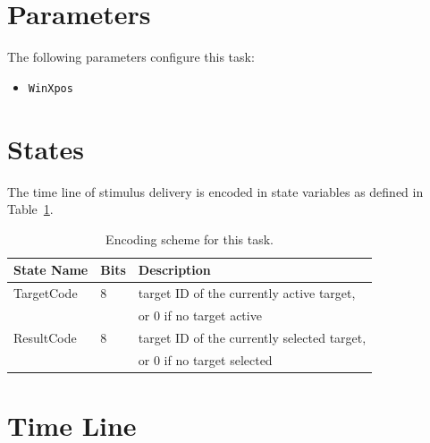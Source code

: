 \documentclass[letterpaper,oneside,12pt]{article}
\begin{document}
\newpage
\section{Parameters}
The following parameters configure this task:
\begin{itemize}
  \item {\tt WinXpos}
\end{itemize}


\section{States}

The time line of stimulus delivery is encoded in state variables as defined in
Table~\ref{tab:states}.
\begin{table}
\begin{center}
\begin{tabular}[ht]{|l|l|l|}
\hline
\bf{State Name}& \bf{Bits}            & \bf{Description} \\
\hline
\hline
 TargetCode & 8 & target ID of the currently active target, \\
            &   & or 0 if no target active \\
 ResultCode & 8 & target ID of the currently selected target, \\
            &   & or 0 if no target selected \\
\hline
\end{tabular}
\caption{Encoding scheme for this task.}
\label{tab:states}
\end{center}
\end{table}

\section{Time Line}


\end{document}
